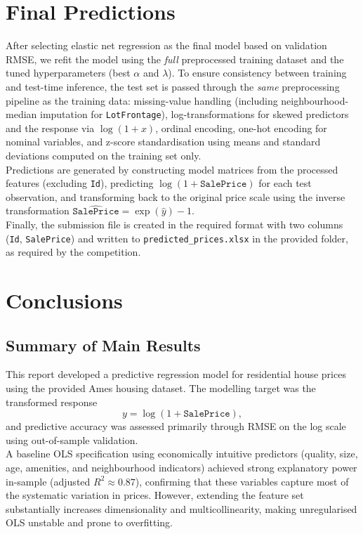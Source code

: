 \documentclass[12pt,oneside]{article} %
\begin{document}
\section{Final Predictions}

\noindent
After selecting elastic net regression as the final model based on validation RMSE, we refit the model using the \emph{full} preprocessed training dataset and the tuned hyperparameters (best $\alpha$ and $\lambda$). To ensure consistency between training and test-time inference, the test set is passed through the \emph{same} preprocessing pipeline as the training data: missing-value handling (including neighbourhood-median imputation for \texttt{LotFrontage}), log-transformations for skewed predictors and the response via $\log(1+x)$, ordinal encoding, one-hot encoding for nominal variables, and z-score standardisation using means and standard deviations computed on the training set only.\\

\noindent
Predictions are generated by constructing model matrices from the processed features (excluding \texttt{Id}), predicting $\log(1+\texttt{SalePrice})$ for each test observation, and transforming back to the original price scale using the inverse transformation $\widehat{\texttt{SalePrice}}=\exp(\widehat{y})-1$.\\

\noindent
Finally, the submission file is created in the required format with two columns (\texttt{Id}, \texttt{SalePrice}) and written to \texttt{predicted\_prices.xlsx} in the provided folder, as required by the competition. 


\section{Conclusions}

\subsection{Summary of Main Results}

This report developed a predictive regression model for residential house prices using the provided Ames housing dataset. The modelling target was the transformed response
\[
y=\log(1+\texttt{SalePrice}),
\]
and predictive accuracy was assessed primarily through RMSE on the log scale using out-of-sample validation.\\

\noindent
A baseline OLS specification using economically intuitive predictors (quality, size, age, amenities, and neighbourhood indicators) achieved strong explanatory power in-sample (adjusted $R^2 \approx 0.87$), confirming that these variables capture most of the systematic variation in prices. However, extending the feature set substantially increases dimensionality and multicollinearity, making unregularised OLS unstable and prone to overfitting.\\
\end{document}
